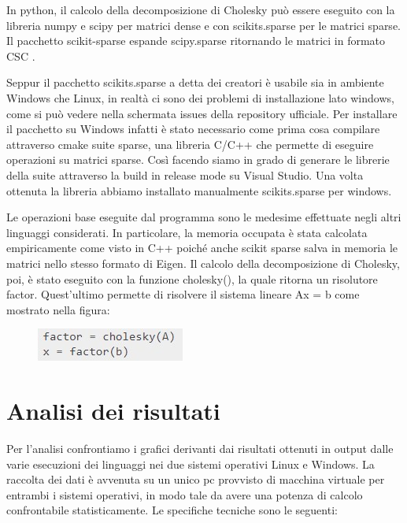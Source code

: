 \documentclass[a4paper,10pt]{article}
\begin{document}
In python, il calcolo della decomposizione di Cholesky può essere eseguito con la libreria numpy e scipy per matrici dense e con scikits.sparse per le matrici sparse. Il pacchetto scikit-sparse espande scipy.sparse ritornando le matrici in formato CSC . 

Seppur il pacchetto scikits.sparse a detta dei creatori è usabile sia in ambiente Windows che Linux, in realtà ci sono dei problemi di installazione lato windows, come si può vedere nella schermata issues della repository ufficiale. Per installare il pacchetto su Windows infatti è stato necessario come prima cosa compilare attraverso cmake suite sparse, una libreria C/C++ che permette di eseguire operazioni su matrici sparse. Così facendo siamo in grado di generare le librerie della suite attraverso la build in release mode su Visual Studio. Una volta ottenuta la libreria abbiamo installato manualmente scikits.sparse per windows. 

Le operazioni base eseguite dal programma sono le medesime effettuate negli altri linguaggi considerati. In particolare, la memoria occupata è stata calcolata empiricamente come visto in C++ poiché anche scikit sparse salva in memoria le matrici nello stesso formato di Eigen. Il calcolo della decomposizione di Cholesky, poi, è stato eseguito con la funzione cholesky(), la quale ritorna un risolutore factor. Quest’ultimo permette di risolvere il sistema lineare Ax = b come mostrato nella figura:

\begin{figure}[H]
\centering
\includegraphics[width=0.4\linewidth]{img/python1.jpg}
\end{figure}

\newpage

\section{Analisi dei risultati}
Per l’analisi confrontiamo i grafici derivanti dai risultati ottenuti in output dalle varie esecuzioni dei linguaggi nei due sistemi operativi Linux e Windows. 
La raccolta dei dati è avvenuta su un unico pc provvisto di macchina virtuale per entrambi i sistemi operativi, in modo tale da avere una potenza di calcolo confrontabile statisticamente.
Le specifiche tecniche sono le seguenti: \\
\end{document}
